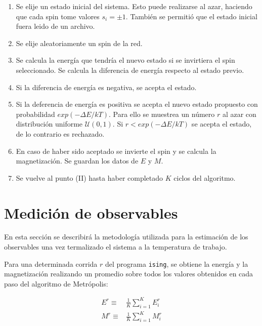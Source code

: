 \documentclass[a4paper,12pt]{article}
\begin{document}
\renewcommand{\theenumi}{\roman{enumi}}
\begin{enumerate}
	\item Se elije un estado inicial del sistema. Esto puede realizarse al 
	azar, haciendo que cada spin tome valores $s_i=\pm1$. También se permitió 
	que el estado inicial fuera leido de un archivo.
	\item Se elije aleatoriamente un spin de la red.
	\item Se calcula la energía que tendría el nuevo estado si se invirtiera el 
	spin seleccionado. Se calcula la diferencia de energía respecto al estado 
	previo.
	\item Si la diferencia de energía es negativa, se acepta el estado. 
	\item Si la deferencia de energía es positiva se acepta el nuevo estado 
	propuesto con probabilidad $exp(-\Delta E/kT)$. Para ello se muestrea un 
	número $r$ al azar con distribución uniforme $\mathcal{U}(0,1)$. Si $r< 
	exp(-\Delta E/kT)$ se acepta el estado, de lo contrario es rechazado.
    \item En caso de haber sido aceptado se invierte el spin y se 
    calcula la magnetización. Se guardan los datos de $E$ y $M$.
    \item Se vuelve al punto (\textrm{II}) hasta haber completado $K$ ciclos 
    del 
    algoritmo.
\end{enumerate}

\section{Medición de observables}

En esta sección se describirá la metodología utilizada para la estimación de 
los observables una vez termalizado el sistema a la temperatura de trabajo.

Para una determinada corrida $r$ del programa \texttt{ising}, se obtiene la 
energía y la magnetización realizando un promedio sobre todos los valores 
obtenidos en cada paso del algoritmo de Metrópolis:

\begin{subequations}
   \begin{align}
  E^r \equiv &\frac{1}{K}\sum_{i=1}^K E^r_i 
  \label{eq:E_prom}\\
  M^r \equiv & \frac{1}{K}\sum_{i=1}^K M^r_i 
  \label{eq:M_prom}
   \end{align}
\end{subequations}
\end{document}
